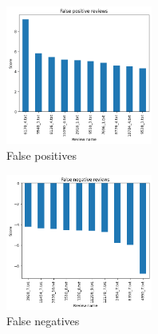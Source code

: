\documentclass{article}
\begin{document}
\begin{multicols}{2}
        \begin{figure}[H]
            \centering
            \includegraphics[width=0.43\textwidth]{false_positives_lr.png}
            \caption{\small False positives}
            \label{fig:falseposlr}
        \end{figure}
    
        \begin{figure}[H]
            \centering
            \includegraphics[width=0.43\textwidth]{false negatives_lr.png}
            \caption{\small False negatives}
            \label{fig:falseneglr}
        \end{figure}
    

\nopagebreak
\end{multicols}

\vfill
\end{document}
